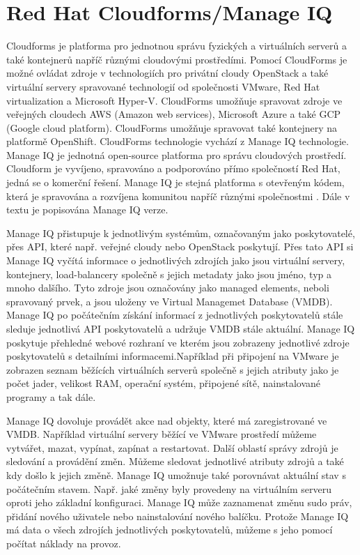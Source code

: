 \section{Red Hat Cloudforms/Manage IQ}
Cloudforms je platforma pro jednotnou správu fyzických a virtuálních serverů a také kontejnerů napříč různými cloudovými prostředími. Pomocí CloudForms je možné ovládat zdroje v technologiích pro privátní cloudy OpenStack a také virtuální servery spravované technologií od společnosti VMware, Red Hat virtualization a Microsoft Hyper-V. CloudForms umožňuje spravovat zdroje ve veřejných cloudech AWS (Amazon web services), Microsoft Azure a také GCP (Google cloud platform). CloudForms umožňuje spravovat také kontejnery na platformě OpenShift. CloudForms technologie vychází z Manage IQ technologie. Manage IQ je jednotná open-source platforma pro správu cloudových prostředí. Cloudform je vyvíjeno, spravováno a podporováno přímo společností Red Hat, jedná se o komerční řešení. Manage IQ je stejná platforma s otevřeným kódem, která je spravována a rozvíjena komunitou napříč různými společnostmi \cite{manageiq}. Dále v textu je popisována Manage IQ verze.\par
    Manage IQ přistupuje k jednotlivým systémům, označovaným jako poskytovatelé, přes API, které např. veřejné cloudy nebo OpenStack poskytují. Přes tato API si \linebreak Manage IQ vyčítá informace o jednotlivých zdrojích  jako jsou virtuální servery, kontejnery, load-balancery společně s jejich metadaty jako jsou jméno, typ a mnoho dalšího. Tyto zdroje jsou označovány jako managed elements, neboli spravovaný prvek, a jsou uloženy ve Virtual Managemet Database (VMDB). Manage IQ po počátečním získání informací z jednotlivých poskytovatelů stále sleduje jednotlivá API poskytovatelů a udržuje VMDB stále aktuální. Manage IQ poskytuje přehledné webové rozhraní ve kterém jsou zobrazeny jednotlivé zdroje poskytovatelů s detailními informacemi.\linebreak Například při připojení na VMware je zobrazen seznam běžících virtuálních serverů společně s jejich atributy jako je počet jader, velikost RAM, operační systém, připojené sítě, nainstalované programy a tak dále. \par
    Manage IQ dovoluje provádět akce nad objekty, které má zaregistrované ve VMDB. Například virtuální servery běžící ve VMware prostředí můžeme vytvářet, mazat, vypínat, zapínat a restartovat. Další oblastí správy zdrojů je sledování a provádění změn. Můžeme sledovat jednotlivé atributy zdrojů a také kdy došlo k jejich změně. Manage IQ umožnuje také porovnávat aktuální stav s počátečním stavem. Např. jaké změny byly provedeny na virtuálním serveru oproti jeho základní konfiguraci. Manage IQ může zaznamenat změnu sudo práv, přidání nového uživatele nebo nainstalování \linebreak nového balíčku. Protože Manage IQ má data o všech zdrojích jednotlivých poskytovatelů, můžeme s jeho pomocí počítat náklady na provoz.\par
